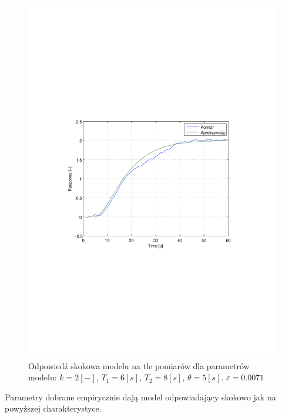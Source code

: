 \documentclass[12pt]{article}
\begin{document}
\begin{figure}[!htb]
	\begin{center}
		\includegraphics[width=14cm,trim=3cm 9cm 3cm 9cm,clip]
		{../res/img/k2_2_6_8_5.pdf}
	\end{center}
	\caption{Odpowiedź skokowa modelu na tle pomiarów dla parametrów modelu:
	$k=2[-]$, $T_1=6[s]$, $T_2=8[s]$, $\theta=5[s]$. $\varepsilon=0.0071$}
\end{figure}

Parametry dobrane empirycznie dają model odpowiadający skokowo jak na powyższej
charakterystyce.

\newpage
\end{document}
